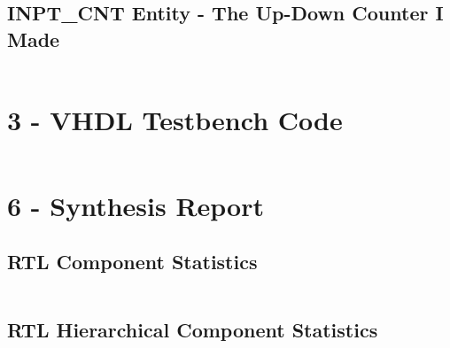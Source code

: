 \documentclass[11pt]{report}
\begin{document}
\newpage

\subsection*{INPT\_CNT Entity - The Up-Down Counter I Made}
\inputminted{vhdl}{../../../DE_Project_T3/DE_Project_T3.srcs/sources_1/new/Param_Counter_UpDown.vhd}

\newpage

\section*{3 - VHDL Testbench Code}
\inputminted{vhdl}{../../../DE_Project_T3/DE_Project_T3.srcs/sim_1/imports/DigEng_Proj_T3_model/TOP_LEVEL_tb.vhd}


\section*{6 - Synthesis Report}

\subsection*{RTL Component Statistics}
\inputminted[firstline=213,lastline=236]{text}{../../../DE_Project_T3/DE_Project_T3.runs/synth_1/TOP_LEVEL.vds}

\newpage

\subsection*{RTL Hierarchical Component Statistics}
\inputminted[firstline=239,lastline=290]{text}{../../../DE_Project_T3/DE_Project_T3.runs/synth_1/TOP_LEVEL.vds}
\end{document}
